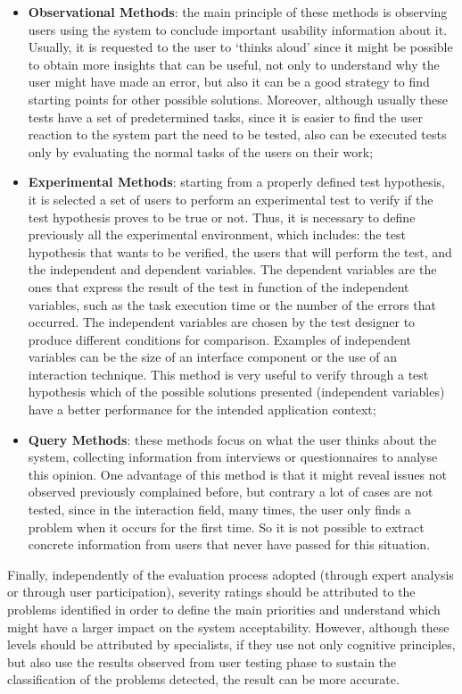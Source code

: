 \begin{itemize}
	\item \textbf{Observational Methods}: the main principle of these methods is observing users using the system to conclude important usability information about it. Usually, it is requested to the user to ‘thinks aloud’ since it might be possible to obtain more insights that can be useful, not only to understand why the user might have made an error, but also it can be a good strategy to find starting points for other possible solutions. Moreover, although usually these tests have a set of predetermined tasks, since it is easier to find the user reaction to the system part the need to be tested, also can be executed tests only by evaluating the normal tasks of the users on their work;
	\item \textbf{Experimental Methods}: starting from a properly defined test hypothesis, it is selected a set of users to perform an experimental test to verify if the test hypothesis proves to be true or not. Thus, it is necessary to define previously all the experimental environment, which includes: the test hypothesis that wants to be verified, the users that will perform the test,  and the independent and dependent variables. The dependent variables are the ones that express the result of the test in function of the independent variables, such as the task execution time or the number of the errors that occurred. The independent variables are chosen by the test designer to produce different conditions for comparison. Examples of independent variables can be the size of an interface component or the use of an interaction technique. This method is very useful to verify through a test hypothesis which of the possible solutions presented (independent variables) have a better performance for the intended application context;
	\item \textbf{Query Methods}: these methods focus on what the user thinks about the system, collecting information from interviews or questionnaires to analyse this opinion. One advantage of this method is that it might reveal issues not observed previously complained before, but contrary a lot of cases are not tested, since in the interaction field, many times, the user only finds a problem when it occurs for the first time. So it is not possible to extract concrete information from users that never have passed for this situation.
\end{itemize}

\bigskip

Finally, independently of the evaluation process adopted (through expert analysis or through user participation), severity ratings should be attributed to the problems identified in order to define the main priorities and understand which might have a larger impact on the system acceptability. However, although these levels should be attributed by specialists, if they use not only cognitive principles, but also use the results observed from user testing phase to sustain the classification of the problems detected, the result can be more accurate. 


